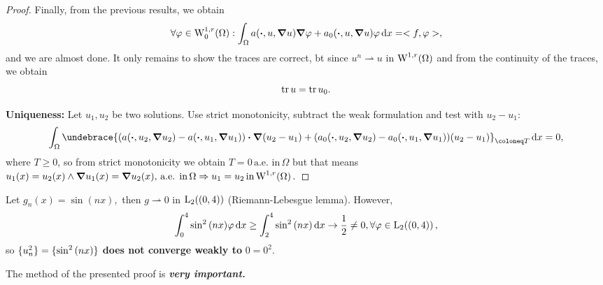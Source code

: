 \documentclass{article}
\begin{document}
\begin{proof}
Finally, from the previous results, we obtain
\[
	\forall \varphi \in \WkpzeroSet[1][r]{\Omega}: \int_{\Omega}a\qty(\vdot, u, \grad u)\grad \varphi+a_0\qty(\vdot, u, \grad u)\varphi\dd{x} = <f,\varphi>,
\]
and we are almost done. It only remains to show the traces are correct, bt since $u^n \rightharpoonup u$ in $\WkpSet[1][r]{\Omega}$ and from the continuity of the traces, we obtain
\[
	\tr u = \tr u_0.
\]

\textbf{Uniqueness:} Let $u_1, u_2$ be two solutions. Use strict monotonicity, subtract the weak formulation and test with $u_2-u_1$:
\[
	\int_{\Omega}\undebrace{\qty(a\qty(\vdot, u_2, \grad u_2)-a\qty(\vdot, u_1, \grad u_1))\vdot \grad\qty(u_2 - u_1)+\qty(a_0\qty(\vdot, u_2, \grad u_2)-a_0\qty(\vdot, u_1, \grad u_1))\qty(u_2-u_1)}_{\coloneq T}\dd{x} =0,
\]
where $T \geq 0$, so from strict monotonicity we obtain $T =0 \, \text{a.e. in} \, \Omega$ but that means $u_1(x) = u_2(x) \wedge \grad u_1(x) = \grad u_2 (x), \, \text{a.e. in} \, \Omega \Rightarrow u_1 = u_2 \, \text{in} \, \WkpSet[1][r]{\Omega}.$
\end{proof}

\begin{example}
	Let $g_n(x) = \sin(nx), $ then $g \rightharpoonup 0$ in $\LpSet[2]{(0,4)}$ (Riemann-Lebesgue lemma). However,
	\[
		\int_0^4 \sin^{2}\qty(nx)\varphi \dd{x} \geq \int_2^4 \sin^{2}\qty(nx)\dd{x} \to \frac{1}{2} \neq 0, \forall \varphi \in \LpSet[2]{(0,4)},
	\]
	so $\{u_n^{2}\} = \{\sin^{2}\qty(nx)\}$ \textbf{does not converge weakly to } $0 = 0^{2}$.
\end{example}
\begin{remark}
    The method of the presented proof is \textbf{\textit{very important.}}
\end{remark}
\end{document}
